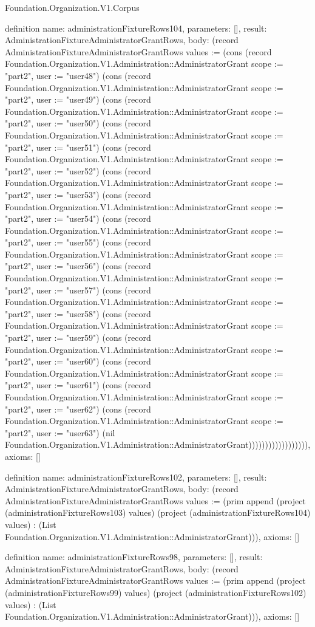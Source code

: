 \begin{lexlean}{Foundation.Organization.V1.Corpus}
\begin{semanticmodule}
definition{
  name: administrationFixtureRows104,
  parameters: [],
  result: AdministrationFixtureAdministratorGrantRows,
  body: (record AdministrationFixtureAdministratorGrantRows {values := (cons (record Foundation.Organization.V1.Administration::AdministratorGrant {scope := "part2", user := "user48"}) (cons (record Foundation.Organization.V1.Administration::AdministratorGrant {scope := "part2", user := "user49"}) (cons (record Foundation.Organization.V1.Administration::AdministratorGrant {scope := "part2", user := "user50"}) (cons (record Foundation.Organization.V1.Administration::AdministratorGrant {scope := "part2", user := "user51"}) (cons (record Foundation.Organization.V1.Administration::AdministratorGrant {scope := "part2", user := "user52"}) (cons (record Foundation.Organization.V1.Administration::AdministratorGrant {scope := "part2", user := "user53"}) (cons (record Foundation.Organization.V1.Administration::AdministratorGrant {scope := "part2", user := "user54"}) (cons (record Foundation.Organization.V1.Administration::AdministratorGrant {scope := "part2", user := "user55"}) (cons (record Foundation.Organization.V1.Administration::AdministratorGrant {scope := "part2", user := "user56"}) (cons (record Foundation.Organization.V1.Administration::AdministratorGrant {scope := "part2", user := "user57"}) (cons (record Foundation.Organization.V1.Administration::AdministratorGrant {scope := "part2", user := "user58"}) (cons (record Foundation.Organization.V1.Administration::AdministratorGrant {scope := "part2", user := "user59"}) (cons (record Foundation.Organization.V1.Administration::AdministratorGrant {scope := "part2", user := "user60"}) (cons (record Foundation.Organization.V1.Administration::AdministratorGrant {scope := "part2", user := "user61"}) (cons (record Foundation.Organization.V1.Administration::AdministratorGrant {scope := "part2", user := "user62"}) (cons (record Foundation.Organization.V1.Administration::AdministratorGrant {scope := "part2", user := "user63"}) (nil Foundation.Organization.V1.Administration::AdministratorGrant)))))))))))))))))}),
  axioms: []
}

definition{
  name: administrationFixtureRows102,
  parameters: [],
  result: AdministrationFixtureAdministratorGrantRows,
  body: (record AdministrationFixtureAdministratorGrantRows {values := (prim append (project (administrationFixtureRows103) values) (project (administrationFixtureRows104) values) : (List Foundation.Organization.V1.Administration::AdministratorGrant))}),
  axioms: []
}

definition{
  name: administrationFixtureRows98,
  parameters: [],
  result: AdministrationFixtureAdministratorGrantRows,
  body: (record AdministrationFixtureAdministratorGrantRows {values := (prim append (project (administrationFixtureRows99) values) (project (administrationFixtureRows102) values) : (List Foundation.Organization.V1.Administration::AdministratorGrant))}),
  axioms: []
}


\end{semanticmodule}
\end{lexlean}
